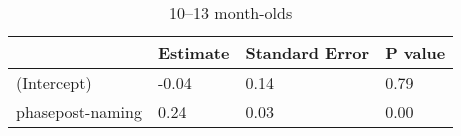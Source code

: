 


\begin{table}[tbp]

\begin{center}
\begin{threeparttable}

\caption{10--13 month-olds}

\begin{tabular}{llll}
\toprule
 & \multicolumn{1}{c}{Estimate} & \multicolumn{1}{c}{Standard Error} & \multicolumn{1}{c}{P value}\\
\midrule
(Intercept) & -0.04 & 0.14 & 0.79\\
phasepost-naming & 0.24 & 0.03 & 0.00\\
\bottomrule
\end{tabular}

\end{threeparttable}
\end{center}

\end{table}



